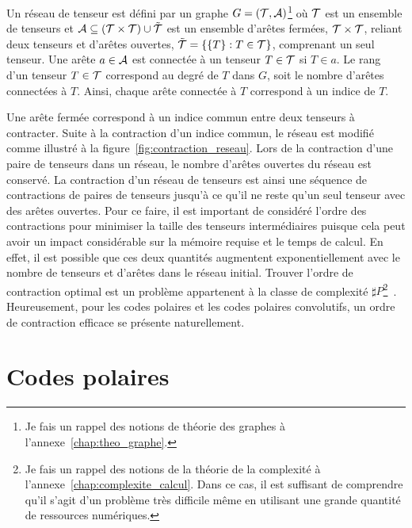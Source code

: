 Un réseau de tenseur est défini par un graphe $G = (\mathcal{T}, \mathcal{A})$\footnote{Je fais 
un rappel des notions de théorie des graphes à l'annexe~\ref{chap:theo_graphe}.} où $\mathcal{T}$ 
est un ensemble de tenseurs et $\mathcal{A} \subseteq (\mathcal{T} \times \mathcal{T}) \cup \tilde{\mathcal{T}}$ 
est un ensemble d'arêtes fermées, $\mathcal{T} \times \mathcal{T}$, reliant deux tenseurs 
et d'arêtes ouvertes, $\tilde {\mathcal{T}} = \qty{\qty{T} : T \in \mathcal{T}}$, comprenant un seul tenseur.
Une arête $a \in \mathcal{A}$ est connectée à un tenseur $T \in \mathcal{T}$ si $T \in a$.
Le rang d'un tenseur $T \in \mathcal{T}$ correspond au degré de $T$ dans $G$,
soit le nombre d'arêtes connectées à $T$.
Ainsi, chaque arête connectée à $T$ correspond à un indice de $T$.

Une arête fermée correspond à un indice commun entre deux tenseurs à contracter.
Suite à la contraction d'un indice commun, le réseau est modifié comme 
illustré à la figure~\ref{fig:contraction_reseau}.
Lors de la contraction d'une paire de tenseurs dans un réseau,
le nombre d'arêtes ouvertes du réseau est conservé.
La contraction d'un réseau de tenseurs est ainsi une séquence de contractions 
de paires de tenseurs jusqu'à ce qu'il ne reste qu'un seul tenseur avec des arêtes ouvertes.
Pour ce faire, 
il est important de considéré l'ordre des contractions pour minimiser la taille 
des tenseurs intermédiaires puisque cela peut avoir un impact considérable sur la mémoire
requise et le temps de calcul.
En effet,
il est possible que ces deux quantités augmentent exponentiellement avec le nombre 
de tenseurs et d'arêtes dans le réseau initial.
Trouver l'ordre de contraction optimal est un problème appartenent 
à la classe de complexité $\sharp P$\footnote{Je fais un rappel des notions de la 
théorie de la complexité à l'annexe~\ref{chap:complexite_calcul}. Dans ce cas, 
il est suffisant de comprendre qu'il s'agit d'un problème très difficile même 
en utilisant une grande quantité de ressources numériques.}~\cite{biamonte_tensor_2015}. 
Heureusement,
pour les codes polaires et les codes polaires convolutifs,
un ordre de contraction efficace se présente naturellement.


\section{Codes polaires}
\label{sec:codes_polaires}


